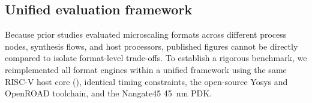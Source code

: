 \subsection{Unified evaluation framework}
\label{sec:eval-compare}

Because prior studies evaluated microscaling formats across different process nodes, synthesis flows, and host processors, published figures cannot be directly compared to isolate format-level trade-offs. To establish a rigorous benchmark, we reimplemented all format engines within a unified framework using the same RISC-V host core (\core), identical timing constraints, the open-source Yosys and OpenROAD toolchain, and the Nangate45 \SI{45}{\nano\meter} PDK.